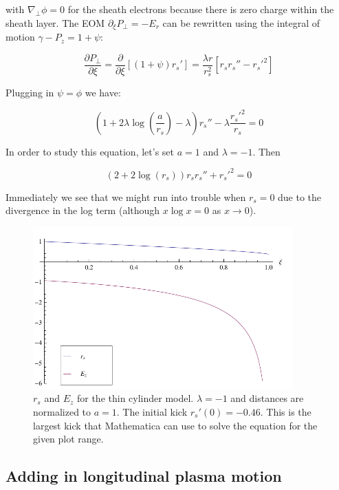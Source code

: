 \documentclass[aps,prl,preprint,groupedaddress]{revtex4-1}
\begin{document}
with $\nabla_{\perp} \phi = 0$ for the sheath electrons because there is zero charge within the sheath layer. The EOM $\partial_{\xi} P_{\perp} = -E_r$ can be rewritten using the integral of motion $\gamma - P_z = 1 + \psi$:

\begin{equation}\label{eq:EOM}
\frac{\partial P_{\perp}}{\partial \xi} = \frac{\partial}{\partial \xi}[(1+\psi)r_s'] = \frac{\lambda r}{r_s^2}[r_s r_s'' - r_s'^2] 
\end{equation}

Plugging in $\psi = \phi$ we have:

\begin{equation}\label{eq:rs}
\left(1+2\lambda\log\left(\frac{a}{r_s}\right) - \lambda\right)r_s'' -\lambda\frac{r_s'^2}{r_s} = 0
\end{equation}

In order to study this equation, let's set $a=1$ and $\lambda = -1$. Then

\begin{equation}\label{eq:rs_simp}
(2+2\log(r_s)) r_s r_s'' + r_s'^2 = 0
\end{equation}

Immediately we see that we might run into trouble when $r_s = 0$ due to the divergence in the log term (although $x\log x = 0$ as $x\rightarrow0$).

\begin{figure}[ht]\label{fig:sheath}
  \centering
    \includegraphics[width=100mm]{./figures/sheath.pdf}
      \caption{$r_s$ and $E_z$ for the thin cylinder model. $\lambda = -1$ and distances are normalized to $a=1$. The initial kick $r_s'(0) = -0.46$. This is the largest kick that Mathematica can use to solve the equation for the given plot range.}
\end{figure}

\subsection{Adding in longitudinal plasma motion}
\end{document}
